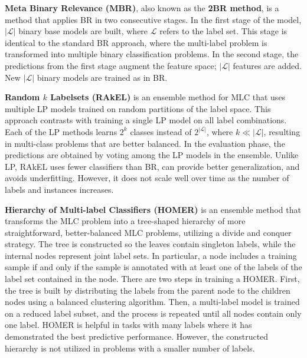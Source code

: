 \textbf{Meta Binary Relevance (MBR)}, also known as the \textbf{2BR method}, is a method that applies BR in two consecutive stages. In the first stage of the model, $\left| \mathcal{L} \right|$ binary base models are built, where $\mathcal{L}$ refers to the label set. This stage is identical to the standard BR approach, where the multi-label problem is transformed into multiple binary classification problems. In the second stage, the predictions from the first stage augment the feature space; $\left| \mathcal{L} \right|$ features are added. New $\left| \mathcal{L} \right|$ binary models are trained as in BR. \cite{bogatinovski2022}

\textbf{Random $k$ Labelsets (RAkEL)} is an ensemble method for MLC that uses multiple LP models trained on random partitions of the label space. This approach contrasts with training a single LP model on all label combinations. Each of the LP methods learns $2^k$ classes instead of $2^{\left|\mathcal{L}\right|}$, where $k \ll \left|\mathcal{L}\right|$, resulting in multi-class problems that are better balanced. In the evaluation phase, the predictions are obtained by voting among the LP models in the ensemble. Unlike LP, RAkEL uses fewer classifiers than BR, can provide better generalization, and avoids underfitting. However, it does not scale well over time as the number of labels and instances increases.

\textbf{Hierarchy of Multi-label Classifiers (HOMER)} is an ensemble method that transforms the MLC problem into a tree-shaped hierarchy of more straightforward, better-balanced MLC problems, utilizing a divide and conquer strategy. The tree is constructed so the leaves contain singleton labels, while the internal nodes represent joint label sets. In particular, a node includes a training sample if and only if the sample is annotated with at least one of the labels of the label set contained in the node. There are two steps in training a HOMER. First, the tree is built by distributing the labels from the parent node to the children nodes using a balanced clustering algorithm. Then, a multi-label model is trained on a reduced label subset, and the process is repeated until all nodes contain only one label. HOMER is helpful in tasks with many labels where it has demonstrated the best predictive performance. However, the constructed hierarchy is not utilized in problems with a smaller number of labels.


